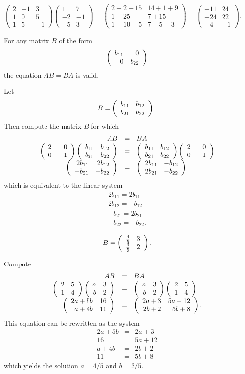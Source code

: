 \documentclass{ximera}
\begin{document}
$\left(\begin{array}{rrr} 2 &  -1 &3\\ 1 & 0 & 5 \\1 & 5 & -1
\end{array}\right)
\left(\begin{array}{rrr} 1 & 7 \\ -2 & -1 \\ -5 & 3\end{array}\right)
= \left(\begin{array}{cc} 2+2-15 & 14+1+9 \\ 1-25 & 7+15 \\
1-10+5 & 7-5-3 \end{array}\right)
= \left(\begin{array}{rr} -11 & 24 \\ -24 & 22 \\ -4 & -1
\end{array}\right)$.


\ans For any matrix $B$ of the form
\[
\left(\begin{array}{rr} b_{11} & 0\\ 0 &b_{22}\end{array}\right)
\]
the equation $AB = BA$ is valid.

\soln Let
\[
B = \left(\begin{array}{rr} b_{11} & b_{12}\\ b_{21} &b_{22}\end{array}\right).
\]
Then compute the matrix $B$ for which
\[
\begin{array}{rcl}
AB & = & BA \\
\left(\begin{array}{rr} 2 & 0\\ 0 &-1\end{array}\right)\left(\begin{array}{rr} b_{11} & b_{12}\\ b_{21} &b_{22}\end{array}\right) &
= & \left(\begin{array}{rr} b_{11} & b_{12}\\ b_{21} &b_{22}\end{array}\right)\left(\begin{array}{rr} 2 & 0\\ 0 &-1\end{array}\right) \\
\left(\begin{array}{rr} 2b_{11} & 2b_{12}\\ -b_{21} &-b_{22}\end{array}\right) & = &
\left(\begin{array}{rr} 2b_{11} & -b_{12}\\ 2b_{21} &-b_{22}\end{array}\right) \end{array}
\]
which is equivalent to the linear system
\[
\begin{array}{l}
2b_{11} = 2b_{11} \\
2b_{12} = -b_{12} \\
-b_{21} = 2b_{21} \\
-b_{22} = -b_{22}. \end{array}
\]

\ans 
\[
B = \left(\begin{array}{rr} \frac{4}{5} & 3\\ \frac{3}{5} &2\end{array}\right).
\]

\soln Compute
\[
\begin{array}{rcl}
AB & = & BA \\
\left(\begin{array}{rr} 2 & 5\\ 1 &4\end{array}\right)\left(\begin{array}{rr} a & 3\\ b &2\end{array}\right) & = &
\left(\begin{array}{rr} a & 3\\ b &2\end{array}\right)\left(\begin{array}{rr} 2 & 5\\ 1 &4\end{array}\right) \\
\left(\begin{array}{rr} 2a+5b & 16\\ a+4b &11\end{array}\right) & = & \left(\begin{array}{rr} 2a+3 & 5a+12\\ 2b+2 &5b+8\end{array}\right).
\end{array}
\]
This equation can be rewritten as the system
\[
\begin{array}{rcl}
2a + 5b & = & 2a + 3 \\
16 & = & 5a + 12 \\
a + 4b & = & 2b + 2 \\
11 & = & 5b + 8 \end{array}
\]
which yields the solution $a = 4/5$ and $b = 3/5$.
\end{document}
